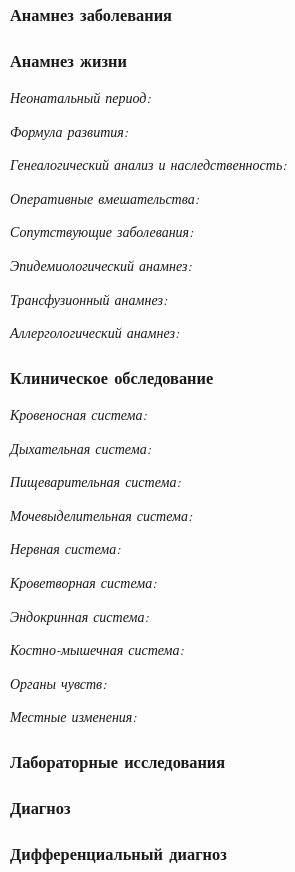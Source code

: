 \documentclass[a4paper,14pt]{extarticle}
\begin{document}
\subsubsection*{Анамнез заболевания}

\subsubsection*{Анамнез жизни}

\emph{Неонатальный период:}

\emph{Формула развития:}

\emph{Генеалогический анализ и наследственность:}

\emph{Оперативные вмешательства:}

\emph{Сопутствующие заболевания:}

\emph{Эпидемиологический анамнез:}

\emph{Трансфузионный анамнез:}

\emph{Аллергологический анамнез:}

\subsubsection*{Клиническое обследование}

\emph{Кровеносная система:}

\emph{Дыхательная система:}

\emph{Пищеварительная система:}

\emph{Мочевыделительная система:}

\emph{Нервная система:} 

\emph{Кроветворная система:}

\emph{Эндокринная система:}

\emph{Костно-мышечная система:}

\emph{Органы чувств:}

\emph{Местные изменения:}

\subsubsection*{Лабораторные исследования}

\subsubsection*{Диагноз}

\subsubsection*{Дифференциальный диагноз}
\end{document}
